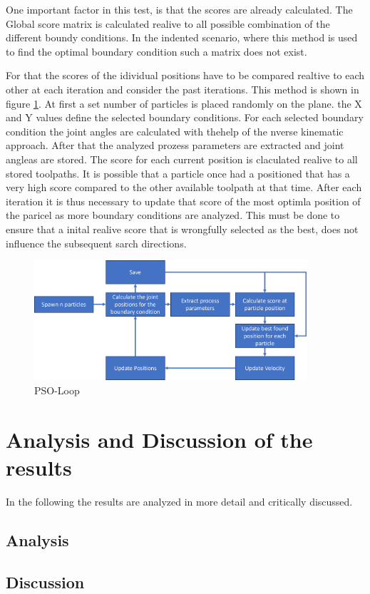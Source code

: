 One important factor in this test, is that the scores are already calculated. The Global score matrix is calculated realive to all possible combination of the different boundy conditions. In the indented scenario, where this method is used to find the optimal boundary condition such a matrix does not exist.

For that the scores of the idividual positions have to be compared realtive to each other at each iteration and consider the past iterations. This method is shown in figure \ref{swarmloop}. At first a set number of particles is placed randomly on the plane. the X and Y values define the selected boundary conditions. For each selected boundary condition the joint angles are calculated with thehelp of the nverse kinematic approach. After that the analyzed prozess parameters are extracted and joint angleas are stored. The score for each current position is claculated realive to all stored toolpaths. It is possible that a particle once had a positioned that has a very high score compared to the other available toolpath at that time. After each iteration it is thus necessary to update that score of the most optimla position of the paricel as more boundary conditions are analyzed. This must be done to ensure that a inital realive score that is wrongfully selected as the best, does not influence the subsequent sarch directions.

\begin{figure}[H]
	\centerline{\includegraphics[width=0.9\textwidth]{figures/swarmloop.png}}
	\caption{PSO-Loop}
	\label{swarmloop}
\end{figure}



\section{Analysis and Discussion of the results}%
In the following the results are analyzed in more detail and critically discussed.

\subsection{Analysis}
\subsection{Discussion}%